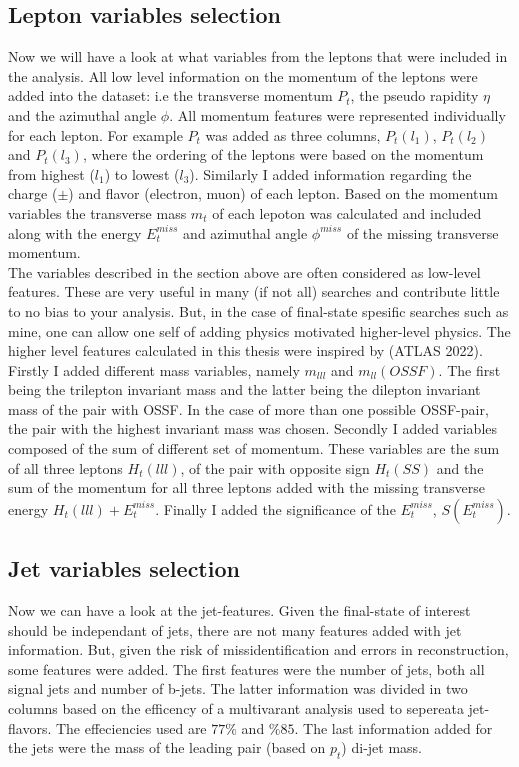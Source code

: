 \subsection{Lepton variables selection}
Now we will have a look at what variables from the leptons that were included in the analysis. All low level information on the
momentum of the leptons were added into the dataset: i.e the transverse momentum $P_t$, the pseudo rapidity $\eta$ and the azimuthal
angle $\phi$. All momentum features were represented individually for each lepton. For example $P_t$ was added as three columns, $P_t(l_1)$,
$P_t(l_2)$ and $P_t(l_3)$, where the ordering of the leptons were based on the momentum from highest ($l_1$) to lowest ($l_3$).
Similarly I added information regarding the charge ($\pm$) and flavor (electron, muon) of each lepton. Based on the momentum variables
the transverse mass $m_t$ of each lepoton was calculated and included along with the energy $E_t^{miss}$ and azimuthal angle $\phi^{miss}$ of
the missing transverse momentum.
\\
The variables described in the section above are often considered as low-level features. These are very useful in many (if not all)
searches and contribute little to no bias to your analysis. But, in the case of final-state spesific searches such as mine,
one can allow one self of adding physics motivated higher-level physics. The higher level features calculated in this thesis
were inspired by \cite{franchini_search_2019} (ATLAS 2022). 
\\
Firstly I added different mass variables, namely $m_{lll}$ and $m_{ll}(OSSF)$. The first being the trilepton invariant mass 
and the latter being the dilepton invariant mass of the pair with OSSF. In the case of more than one possible OSSF-pair,
the pair with the highest invariant mass was chosen. Secondly I added variables composed of the sum of different set of momentum.
These variables are the sum of all three leptons $H_t(lll)$, of the pair with opposite sign $H_t(SS)$ and the sum of the momentum
for all three leptons added with the missing transverse energy $H_t(lll) + E_t^{miss}$. Finally I added the significance of the
$E_t^{miss}$, $S(E_t^{miss})$.
\subsection{Jet variables selection}
Now we can have a look at the jet-features. Given the final-state of interest should be independant of jets, there are not many
features added with jet information. But, given the risk of missidentification and errors in reconstruction, some features were 
added. The first features were the number of jets, both all signal jets and number of b-jets.
The latter information was divided in two columns based on the efficency of a multivarant analysis used to sepereata jet-flavors.
The effeciencies used are $77\%$ and $\%85$. The last information added for the jets were the mass of the leading pair (based on $p_t$)
di-jet mass.
